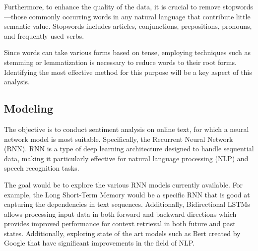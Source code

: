 \documentclass{article}
\begin{document}
Furthermore, to enhance the quality of the data, it is crucial to remove stopwords—those commonly occurring words in any natural language that contribute little semantic value. Stopwords includes articles, conjunctions, prepositions, pronouns, and frequently used verbs.  

Since words can take various forms based on tense, employing techniques such as stemming or lemmatization is necessary to reduce words to their root forms\cite{stanford_nlp_stemming_lemmatization}. Identifying the most effective method for this purpose will be a key aspect of this analysis.

\subsection{Modeling}

The objective is to conduct sentiment analysis on online text, for which a neural network model is most suitable. Specifically, the Recurrent Neural Network (RNN). RNN is a type of deep learning architecture designed to handle sequential data, making it particularly effective for natural language processing (NLP) and speech recognition tasks\cite{shervine_rnn_cheatsheet}.

The goal would be to explore the various RNN models currently available. For example, the Long Short-Term Memory would be a specific RNN that is good at capturing the dependencies in text sequences. Additionally, Bidirectional LSTMs allows processing input data in both forward and backward directions which provides improved performance for context retrieval in both future and past states. Additionally, exploring state of the art models such as Bert\cite{huggingface_bert} created by Google that have significant improvements in the field of NLP. 

\pagebreak



\end{document}
